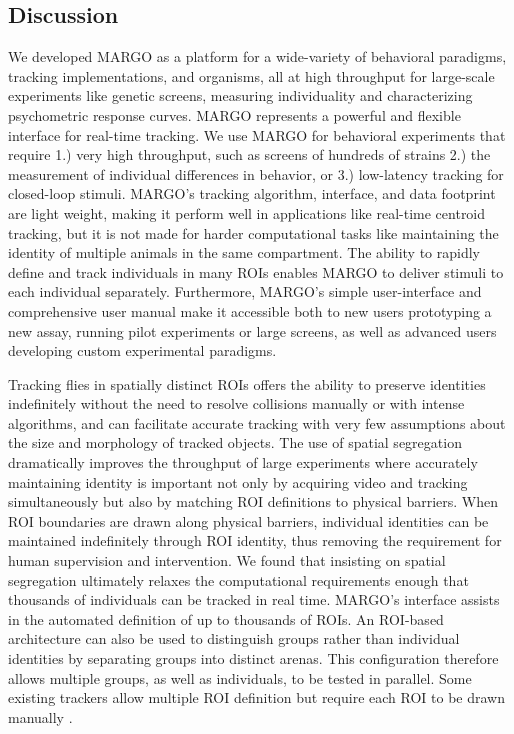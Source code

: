 \documentclass[10pt]{article}
\begin{document}
\begin{multicols}{2}
\section*{Discussion}

We developed MARGO as a platform for a wide-variety of behavioral paradigms, tracking implementations, and organisms, all at high throughput for large-scale experiments like genetic screens, measuring individuality and characterizing psychometric response curves. MARGO represents a powerful and flexible interface for real-time tracking. We use MARGO for behavioral experiments that require 1.) very high throughput, such as screens of hundreds of strains 2.) the measurement of individual differences in behavior, or 3.) low-latency tracking for closed-loop stimuli. MARGO's tracking algorithm, interface, and data footprint are light weight, making it perform well in applications like real-time centroid tracking, but it is not made for harder computational tasks like maintaining the identity of multiple animals in the same compartment. The ability to rapidly define and track individuals in many ROIs enables MARGO to deliver stimuli to each individual separately. Furthermore, MARGO's simple user-interface and comprehensive user manual make it accessible both to new users prototyping a new assay, running pilot experiments or large screens, as well as advanced users developing custom experimental paradigms.

Tracking flies in spatially distinct ROIs offers the ability to preserve identities indefinitely without the need to resolve collisions manually or with intense algorithms, and can facilitate accurate tracking with very few assumptions about the size and morphology of tracked objects. The use of spatial segregation dramatically improves the throughput of large experiments where accurately maintaining identity is important not only by acquiring video and tracking simultaneously but also by matching ROI definitions to physical barriers. When ROI boundaries are drawn along physical barriers, individual identities can be maintained indefinitely through ROI identity, thus removing the requirement for human supervision and intervention. We found that insisting on spatial segregation ultimately relaxes the computational requirements enough that thousands of individuals can be tracked in real time. MARGO's interface assists in the automated definition of up to thousands of ROIs. An ROI-based architecture can also be used to distinguish groups rather than individual identities by separating groups into distinct arenas. This configuration therefore allows multiple groups, as well as individuals, to be tested in parallel. Some existing trackers allow multiple ROI definition but require each ROI to be drawn manually \cite{Prez-Escudero_idTracker_2014,Mnck_BioTracker_2018}.


\end{multicols}
\end{document}
